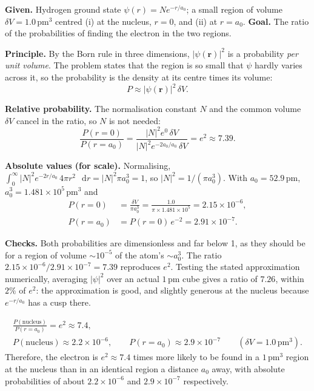 \documentclass[12pt]{article}
\newif\ifsolutions
\renewcommand{\d}{\mathop{}\!\mathrm{d}}
\begin{document}
\ifsolutions
\begin{solutionbox}
\textbf{Given.} Hydrogen ground state $\psi(r)=N e^{-r/a_0}$; a small region of volume $\delta V=1.0\,\mathrm{pm}^3$ centred (i) at the nucleus, $r=0$, and (ii) at $r=a_0$. \textbf{Goal.} The ratio of the probabilities of finding the electron in the two regions.

\textbf{Principle.} By the Born rule in three dimensions, $|\psi(\mathbf r)|^2$ is a probability \emph{per unit volume}. The problem states that the region is so small that $\psi$ hardly varies across it, so the probability is the density at its centre times its volume:
\[
P\approx|\psi(\mathbf r)|^2\,\delta V .
\]

\textbf{Relative probability.} The normalisation constant $N$ and the common volume $\delta V$ cancel in the ratio, so $N$ is not needed:
\[
\frac{P(r=0)}{P(r=a_0)}=\frac{|N|^2e^{0}\,\delta V}{|N|^2e^{-2a_0/a_0}\,\delta V}=e^{2}\approx7.39 .
\]

\textbf{Absolute values (for scale).} Normalising, $\int_0^\infty|N|^2e^{-2r/a_0}\,4\pi r^2\,\d r=|N|^2\pi a_0^3=1$, so $|N|^2=1/(\pi a_0^3)$. With $a_0=52.9\,\mathrm{pm}$, $a_0^3=1.481\times10^{5}\,\mathrm{pm}^3$ and
\begin{align*}
P(r=0)&=\frac{\delta V}{\pi a_0^3}=\frac{1.0}{\pi\times1.481\times10^{5}}=2.15\times10^{-6},\\
P(r=a_0)&=P(r=0)\,e^{-2}=2.91\times10^{-7}.
\end{align*}

\textbf{Checks.} Both probabilities are dimensionless and far below 1, as they should be for a region of volume $\sim10^{-5}$ of the atom's $\sim a_0^3$. The ratio $2.15\times10^{-6}/2.91\times10^{-7}=7.39$ reproduces $e^2$. Testing the stated approximation numerically, averaging $|\psi|^2$ over an actual $1\,\mathrm{pm}$ cube gives a ratio of $7.26$, within $2\%$ of $e^2$: the approximation is good, and slightly generous at the nucleus because $e^{-r/a_0}$ has a cusp there.
\end{solutionbox}

\begin{answerbox}
\begin{gather*}
\frac{P(\text{nucleus})}{P(r=a_0)}=e^{2}\approx7.4,\\
P(\text{nucleus})\approx2.2\times10^{-6},\qquad P(r=a_0)\approx2.9\times10^{-7}\qquad(\delta V=1.0\,\mathrm{pm}^3).
\end{gather*}
Therefore, the electron is $e^2\approx7.4$ times more likely to be found in a $1\,\mathrm{pm}^3$ region at the nucleus than in an identical region a distance $a_0$ away, with absolute probabilities of about $2.2\times10^{-6}$ and $2.9\times10^{-7}$ respectively.
\end{answerbox}
\end{document}

